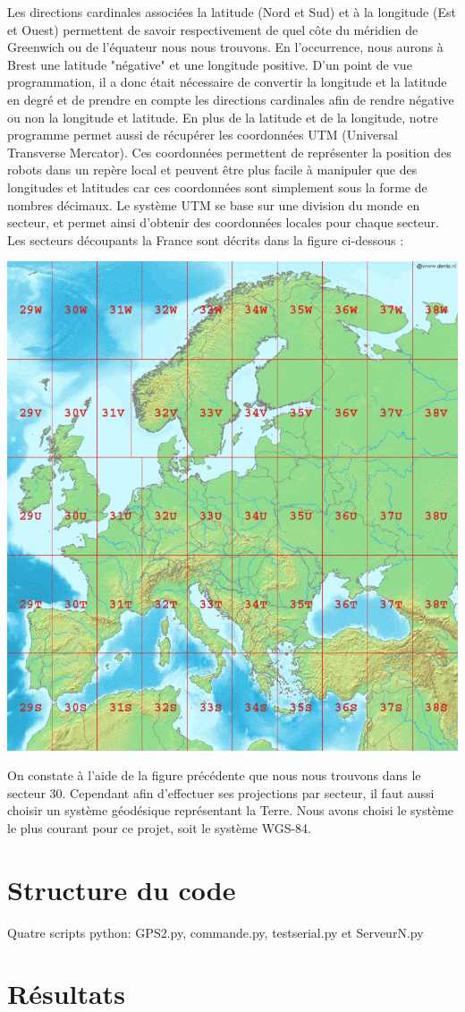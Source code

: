 \documentclass[10pt,a4paper]{report}
\begin{document}
Les directions cardinales associées la latitude (Nord et Sud) et à la longitude (Est et Ouest) permettent de savoir respectivement de quel côte du méridien de Greenwich ou de l'équateur nous nous trouvons. En l'occurrence, nous aurons à Brest une latitude "négative" et une longitude positive.\newline
D'un point de vue programmation, il a donc était nécessaire de convertir la longitude et la latitude en degré et de prendre en compte les directions cardinales afin de rendre négative ou non la longitude et latitude.\newline
En plus de la latitude et de la longitude, notre programme permet aussi de récupérer les coordonnées UTM (Universal Transverse Mercator). Ces coordonnées permettent de représenter la position des robots dans un repère local et peuvent être plus facile à manipuler que des longitudes et latitudes car ces coordonnées sont simplement sous la forme de nombres décimaux. Le système UTM se base sur une division du monde en secteur, et permet ainsi d'obtenir des coordonnées locales pour chaque secteur. Les secteurs découpants la France sont décrits dans la figure ci-dessous :\newline
\begin{center}
\includegraphics[scale=0.2]{secteurUTM.png} 
\label{fig1}
\end{center}
On constate à l'aide de la figure précédente que nous nous trouvons dans le secteur 30. Cependant afin d'effectuer ses projections par secteur, il faut aussi choisir un système géodésique représentant la Terre. Nous avons choisi le système le plus courant pour ce projet, soit le système WGS-84.

\section{Structure du code}

Quatre scripts python: GPS2.py, commande.py, testserial.py et ServeurN.py

\section{Résultats}
\end{document}
